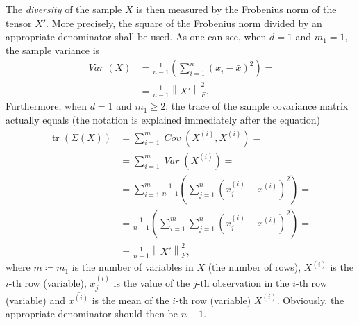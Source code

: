 \documentclass[conference, a4paper, 12pt]{IEEEtran}
\DeclareMathOperator{\tr}{\mathrm{tr}}
\newcommand*{\mean}[1]{\bar{#1}}
\newcommand*{\Mean}[1]{\overline{#1}}
\DeclareMathOperator{\Var}{\mathit{Var}}
\DeclareMathOperator{\Cov}{\mathit{Cov}}
\begin{document}
    The \emph{diversity} of the sample $ X $ is then measured by the Frobenius norm of the tensor $ X ' $. More precisely, the square of the Frobenius norm divided by an appropriate denominator shall be used. As one can see, when $ d = 1 $ and $ m_{1} = 1 $, the sample variance is
    \begin{equation*}
        \begin{split}
            \Var \left( X \right) & = \frac{1}{n - 1} \left( \sum_{i = 1}^{n} \left( x_{i} - \mean{x} \right)^{2} \right) = { } \\
            { } & = \frac{1}{n - 1} \left\lVert X ' \right\rVert_{F}^{2} \text{.}
        \end{split}
    \end{equation*}
    Furthermore, when $ d = 1 $ and $ m_{1} \geq 2 $, the trace of the sample covariance matrix actually equals (the notation is explained immediately after the equation)
    \begin{equation*}
        \begin{split}
            \tr \left( \Sigma \left( X \right) \right) & = \sum_{i = 1}^{m} \Cov \left( X^{\left( i \right)} , X^{\left( i \right)} \right) = { } \\
            { } & = \sum_{i = 1}^{m} \Var \left( X^{\left( i \right)} \right) = { } \\
            { } & = \sum_{i = 1}^{m} \frac{1}{n - 1} \left( \sum_{j = 1}^{n} \left( x_{j}^{\left( i \right)} - \Mean{x^{\left( i \right)}} \right)^{2} \right) = { } \\
            { } & = \frac{1}{n - 1} \left( \sum_{i = 1}^{m} \sum_{j = 1}^{n} \left( x_{j}^{\left( i \right)} - \Mean{x^{\left( i \right)}} \right)^{2} \right) = { } \\
            { } & = \frac{1}{n - 1} \left\lVert X ' \right\rVert_{F}^{2} \text{,}
        \end{split}
    \end{equation*}
    where $ m \coloneqq m_{1} $ is the number of variables in $ X $ (the number of rows), $ X^{\left( i \right)} $ is the $ i $-th row (variable), $ x_{j}^{\left( i \right)} $ is the value of the $ j $-th observation in the $ i $-th row (variable) and $ \Mean{x^{\left( i \right)}} $ is the mean of the $ i $-th row (variable) $ X^{\left( i \right)} $. Obviously, the appropriate denominator should then be $ n - 1 $.

    \par
\end{document}
